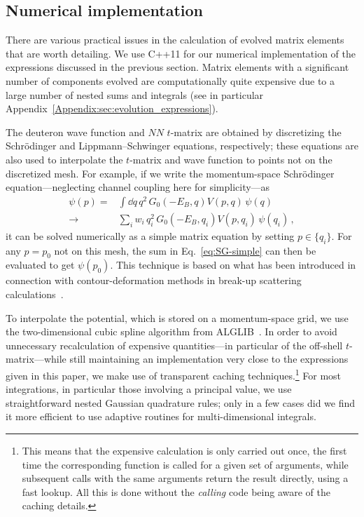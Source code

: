 	\subsection{Numerical implementation}
	\label{subsec:numerical_implementation}

	There are various practical issues in the calculation of evolved matrix
	elements that are worth detailing.  We use C++11 for our numerical
	implementation of	the expressions discussed in the previous section.  Matrix
	elements with a	significant	number of components evolved are computationally
	quite expensive due to a large number of nested sums and integrals (see in
	particular Appendix~\ref{Appendix:sec:evolution_expressions}).

	The deuteron wave function and $NN$ $t$-matrix are obtained by discretizing
	the	Schr\"{o}dinger and Lippmann--Schwinger equations, respectively; these
	equations
	are also used to interpolate the $t$-matrix and wave function to points not on
	the discretized mesh.  For example, if we write the momentum-space Schrödinger
	equation---neglecting channel coupling here for simplicity---as
	\begin{eqnarray}
	 \psi(p) =& \int \dd q\,q^2\,G_0(-E_B,q) V(p,q)\,\psi(q) \nonumber \\
	 \rightarrow& \sum_{i} w_i\,q_i^2\,G_0(-E_B,q_i) V(p,q_i)\,\psi(q_i) \,,
	\label{eq:SG-simple}
  \end{eqnarray}
	it can be solved numerically as a simple matrix equation by setting
	$p\in\{q_i\}$.  For any $p=p_0$ not on this mesh, the sum in
	Eq.~\eqref{eq:SG-simple} can then be evaluated to get $\psi(p_0)$.  This
	technique is based on what has been introduced in connection with
	contour-deformation methods in break-up scattering
	calculations~\cite{Hetherington:1965zza,Schmid:1974}.

	To interpolate the potential, which is stored on a momentum-space grid, we use
	the  two-dimensional cubic spline algorithm from ALGLIB~\cite{ALGLIB:0915}.
	In order to avoid unnecessary recalculation of expensive quantities---in
	particular of the off-shell $t$-matrix---while still maintaining an
	implementation very	close to the expressions given in this paper, we make use
	of transparent caching
	techniques.\footnote{This means that the expensive calculation is only carried
	out once, the first time the corresponding function is called for a given set
	of arguments, while subsequent calls with the same arguments return the result
	directly, using a fast lookup.  All this is done without the \emph{calling}
	code being aware of the caching details.}  For most integrations, in
	particular those involving a  principal value, we use straightforward nested
	Gaussian quadrature
	rules; only in a few cases did we find it more efficient to use adaptive
	routines for multi-dimensional integrals.

